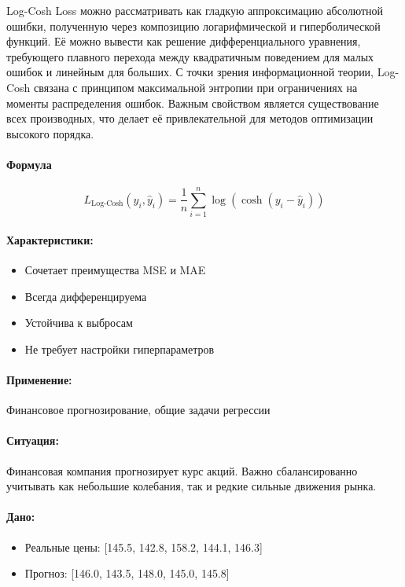 \documentclass[12pt]{article}
\theoremstyle{definition}
\theoremstyle{definition}
\theoremstyle{definition}
\theoremstyle{remark}
\theoremstyle{remark}
\begin{document}
Log-Cosh Loss можно рассматривать как гладкую аппроксимацию абсолютной ошибки, полученную через композицию логарифмической и гиперболической функций. Её можно вывести как решение дифференциального уравнения, требующего плавного перехода между квадратичным поведением для малых ошибок и линейным для больших. С точки зрения информационной теории, Log-Cosh связана с принципом максимальной энтропии при ограничениях на моменты распределения ошибок. Важным свойством является существование всех производных, что делает её привлекательной для методов оптимизации высокого порядка.

\paragraph{Формула}

\[
L_{\text{Log-Cosh}}(y_i, \hat{y}_i) = \frac{1}{n} \sum_{i=1}^{n} \log(\cosh(y_i - \hat{y}_i))
\]

\paragraph{Характеристики:}
\begin{itemize}
    \item Сочетает преимущества MSE и MAE
    \item Всегда дифференцируема
    \item Устойчива к выбросам
    \item Не требует настройки гиперпараметров
\end{itemize}

\paragraph{Применение:} Финансовое прогнозирование, общие задачи регрессии

\paragraph{Ситуация:} Финансовая компания прогнозирует курс акций. Важно сбалансированно учитывать как небольшие колебания, так и редкие сильные движения рынка.

\paragraph{Дано:}
\begin{itemize}
    \item Реальные цены: [145.5, 142.8, 158.2, 144.1, 146.3]
    \item Прогноз: [146.0, 143.5, 148.0, 145.0, 145.8]
\end{itemize}
\end{document}
